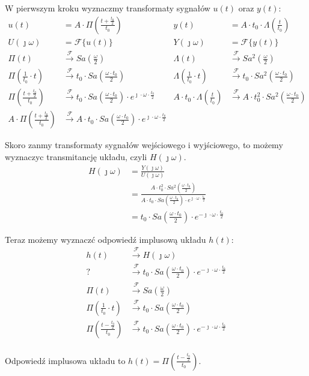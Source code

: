 \begin{task}
W pierwszym kroku wyznaczmy transformaty sygnałów $u(t)$ oraz $y(t)$:
\begin{align*}
u(t)&= A \cdot \Pi\left(\frac{t+\frac{t_0}{2}}{t_0}\right) & y(t)&= A \cdot t_0 \cdot \Lambda\left(\frac{t}{t_0}\right)\\
U(\jmath \omega)&=\mathcal F \{u(t)\} & Y(\jmath \omega)&=\mathcal F \{y(t)\} \\
\Pi(t) &\xrightarrow{\mathcal F} Sa\left(\frac{\omega}{2}\right) & \Lambda(t) &\xrightarrow{\mathcal F} Sa^2\left(\frac{\omega}{2}\right)\\
\Pi\left(\frac{1}{t_0} \cdot t \right) &\xrightarrow{\mathcal F} t_0 \cdot Sa\left(\frac{\omega \cdot t_0}{2}\right) & \Lambda\left(\frac{1}{t_0} \cdot t \right) &\xrightarrow{\mathcal F} t_0 \cdot Sa^2\left(\frac{\omega \cdot t_0}{2}\right)\\
\Pi\left(\frac{t+\frac{t_0}{2}}{t_0}\right) &\xrightarrow{\mathcal F} t_0 \cdot Sa\left(\frac{\omega \cdot t_0}{2}\right) \cdot e^{\jmath \cdot \omega \cdot \frac{t_0}{2}} & A \cdot t_0 \cdot \Lambda\left(\frac{t}{t_0}\right) &\xrightarrow{\mathcal F} A \cdot t_0^2 \cdot Sa^2\left(\frac{\omega \cdot t_0}{2}\right)\\
A \cdot \Pi\left(\frac{t+\frac{t_0}{2}}{t_0}\right) &\xrightarrow{\mathcal F} A \cdot t_0 \cdot Sa\left(\frac{\omega \cdot t_0}{2}\right) \cdot e^{\jmath \cdot \omega \cdot \frac{t_0}{2}} &  &
\end{align*}

Skoro zanmy transformaty sygnałów wejściowego i wyjściowego, to możemy wyznaczyc transmitancję układu, czyli $H(\jmath \omega)$. 
\begin{align*}
H(\jmath \omega)&=\frac{Y(\jmath \omega)}{U(\jmath \omega)}\\
&=\frac{A \cdot t_0^2 \cdot Sa^2\left(\frac{\omega \cdot t_0}{2}\right)}{A \cdot t_0 \cdot Sa\left(\frac{\omega \cdot t_0}{2}\right) \cdot e^{\jmath \cdot \omega \cdot \frac{t_0}{2}}}\\
&=t_0 \cdot Sa\left(\frac{\omega \cdot t_0}{2}\right) \cdot e^{-\jmath \cdot \omega \cdot \frac{t_0}{2}}
\end{align*}

Teraz możemy wyznaczć odpowied\'{z} implusową układu $h(t)$:
\begin{align*}
h(t) &\xrightarrow{\mathcal F} H(\jmath \omega)\\
? &\xrightarrow{\mathcal F} t_0 \cdot Sa\left(\frac{\omega \cdot t_0}{2}\right) \cdot e^{-\jmath \cdot \omega \cdot \frac{t_0}{2}}\\
\Pi(t) &\xrightarrow{\mathcal F} Sa\left(\frac{\omega}{2}\right)\\
\Pi\left(\frac{1}{t_0} \cdot t \right) &\xrightarrow{\mathcal F} t_0 \cdot Sa\left(\frac{\omega \cdot t_0}{2}\right)\\
\Pi\left(\frac{t-\frac{t_0}{2}}{t_0}\right) &\xrightarrow{\mathcal F} t_0 \cdot Sa\left(\frac{\omega \cdot t_0}{2}\right) \cdot e^{-\jmath \cdot \omega \cdot \frac{t_0}{2}}\\
\end{align*}


Odpowied\'{z} implusowa układu to $h(t)= \Pi\left(\frac{t-\frac{t_0}{2}}{t_0}\right)$.
\end{task}

